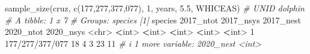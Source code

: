 \documentclass[
]{book}
\newenvironment{Shaded}{\begin{snugshade}}{\end{snugshade}}
\newcommand{\AttributeTok}[1]{\textcolor[rgb]{0.77,0.63,0.00}{#1}}
\newcommand{\CommentTok}[1]{\textcolor[rgb]{0.56,0.35,0.01}{\textit{#1}}}
\newcommand{\DecValTok}[1]{\textcolor[rgb]{0.00,0.00,0.81}{#1}}
\newcommand{\ErrorTok}[1]{\textcolor[rgb]{0.64,0.00,0.00}{\textbf{#1}}}
\newcommand{\FloatTok}[1]{\textcolor[rgb]{0.00,0.00,0.81}{#1}}
\newcommand{\FunctionTok}[1]{\textcolor[rgb]{0.00,0.00,0.00}{#1}}
\newcommand{\NormalTok}[1]{#1}
\newcommand{\SpecialCharTok}[1]{\textcolor[rgb]{0.00,0.00,0.00}{#1}}
\newcommand{\StringTok}[1]{\textcolor[rgb]{0.31,0.60,0.02}{#1}}
\begin{document}
\begin{Shaded}
\begin{Highlighting}[]
\FunctionTok{sample\_size}\NormalTok{(cruz, }\FunctionTok{c}\NormalTok{(}\StringTok{\textquotesingle{}177\textquotesingle{}}\NormalTok{,}\StringTok{\textquotesingle{}277\textquotesingle{}}\NormalTok{,}\StringTok{\textquotesingle{}377\textquotesingle{}}\NormalTok{,}\StringTok{\textquotesingle{}077\textquotesingle{}}\NormalTok{), }
            \DecValTok{1}\NormalTok{, years, }\FloatTok{5.5}\NormalTok{, }\StringTok{\textquotesingle{}WHICEAS\textquotesingle{}}\NormalTok{) }\CommentTok{\# UNID dolphin}
\CommentTok{\# A tibble: 1 x 7}
\CommentTok{\# Groups:   species [1]}
\NormalTok{  species         }\StringTok{\textasciigrave{}}\AttributeTok{2017\_ntot}\StringTok{\textasciigrave{}} \StringTok{\textasciigrave{}}\AttributeTok{2017\_nsys}\StringTok{\textasciigrave{}} \StringTok{\textasciigrave{}}\AttributeTok{2017\_nest}\StringTok{\textasciigrave{}} \StringTok{\textasciigrave{}}\AttributeTok{2020\_ntot}\StringTok{\textasciigrave{}} \StringTok{\textasciigrave{}}\AttributeTok{2020\_nsys}\StringTok{\textasciigrave{}}
  \SpecialCharTok{\textless{}}\NormalTok{chr}\SpecialCharTok{\textgreater{}}                 \ErrorTok{\textless{}}\NormalTok{int}\SpecialCharTok{\textgreater{}}       \ErrorTok{\textless{}}\NormalTok{int}\SpecialCharTok{\textgreater{}}       \ErrorTok{\textless{}}\NormalTok{int}\SpecialCharTok{\textgreater{}}       \ErrorTok{\textless{}}\NormalTok{int}\SpecialCharTok{\textgreater{}}       \ErrorTok{\textless{}}\NormalTok{int}\SpecialCharTok{\textgreater{}}
\DecValTok{1} \DecValTok{177}\SpecialCharTok{/}\DecValTok{277}\SpecialCharTok{/}\DecValTok{377}\SpecialCharTok{/}\DecValTok{077}          \DecValTok{18}           \DecValTok{4}           \DecValTok{3}          \DecValTok{23}          \DecValTok{11}
\CommentTok{\# i 1 more variable: \textasciigrave{}2020\_nest\textasciigrave{} \textless{}int\textgreater{}}


\end{Highlighting}
\end{Shaded}
\end{document}
